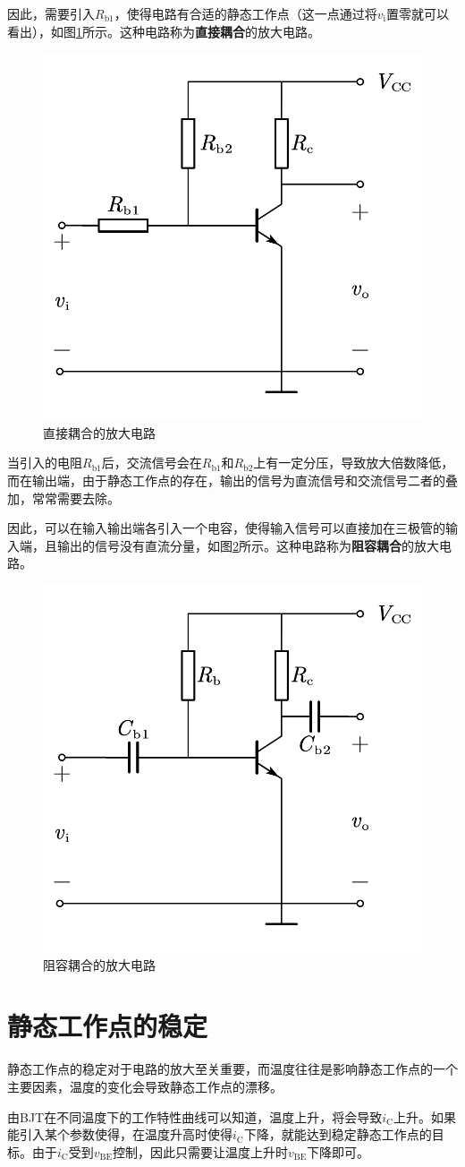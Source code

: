 因此，需要引入$R_\mathrm{b1}$，使得电路有合适的静态工作点（这一点通过将$v_\mathrm{i}$置零就可以看出），如图\ref{6}所示。这种电路称为\textbf{直接耦合}的放大电路。

\begin{figure}[htb]
    \centering
    \includegraphics[width=0.35\linewidth]{pic/appendixApic/6.pdf}
    \caption{直接耦合的放大电路\label{6}}
\end{figure}

当引入的电阻$R_\mathrm{b1}$后，交流信号会在$R_\mathrm{b1}$和$R_\mathrm{b2}$上有一定分压，导致放大倍数降低，而在输出端，由于静态工作点的存在，输出的信号为直流信号和交流信号二者的叠加，常常需要去除。

因此，可以在输入输出端各引入一个电容，使得输入信号可以直接加在三极管的输入端，且输出的信号没有直流分量，如图\ref{7}所示。这种电路称为\textbf{阻容耦合}的放大电路。

\begin{figure}[htb]
    \centering
    \includegraphics[width=0.35\linewidth]{pic/appendixApic/7.pdf}
    \caption{阻容耦合的放大电路\label{7}}
\end{figure}

\section{静态工作点的稳定}
静态工作点的稳定对于电路的放大至关重要，而温度往往是影响静态工作点的一个主要因素，温度的变化会导致静态工作点的漂移。

由BJT在不同温度下的工作特性曲线可以知道，温度上升，将会导致$i_\mathrm{C}$上升。如果能引入某个参数使得，在温度升高时使得$i_\mathrm{C}$下降，就能达到稳定静态工作点的目标。由于$i_\mathrm{C}$受到$v_{\mathrm{BE}}$控制，因此只需要让温度上升时$v_{\mathrm{BE}}$下降即可。

